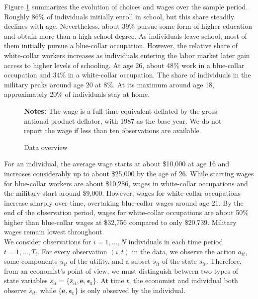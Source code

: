 \noindent Figure \ref{Overview} summarizes the evolution of choices and wages over the sample period. Roughly 86\% of individuals initially enroll in school, but this share steadily declines with age. Nevertheless, about 39\% pursue some form of higher education and obtain more than a high school degree. As individuals leave school, most of them initially pursue a blue-collar occupation. However, the relative share of white-collar workers increases as individuals entering the labor market later gain access to higher levels of schooling. At age 26, about 48\% work in a blue-collar occupation and 34\% in a white-collar occupation. The share of individuals in the military peaks around age 20 at 8\%. At its maximum around age 18, approximately 20\% of individuals stay at home.\\

\begin{figure}[t!]\centering
{}\hspace{0.3cm}
\begin{center}
\begin{minipage}[t]{0.8\columnwidth}
\item \scriptsize{\textbf{Notes:} The wage is a full-time equivalent deflated by the gross national product deflator, with 1987 as the base year. We do not report the wage if less than ten observations are available.}
\end{minipage}
\end{center}
\caption{Data overview}\label{Overview}
\end{figure}\FloatBarrier

\noindent For an individual, the average wage starts at about \$10,000 at age 16 and increases considerably up to about \$25,000 by the age of 26. While starting wages for blue-collar workers are about \$10,286, wages in white-collar occupations and the military start around \$9,000. However, wages for white-collar occupations increase sharply over time, overtaking blue-collar wages around age 21. By the end of the observation period, wages for white-collar occupations are about 50\% higher than blue-collar wages at \$32,756 compared to only \$20,739. Military wages remain lowest throughout.\\

\noindent We consider observations for $i = 1, \hdots, N$ individuals in each time period $t = 1, \dots, T_i$. For every observation $(i, t)$ in the data, we observe the action $a_{it}$, some components $\bar{u}_{it}$ of the utility, and a subset $\bar{s}_{it}$ of the state $s_{it}$. Therefore, from an economist's point of view, we must distinguish between two types of state variables $s_{it} = \{\bar{s}_{it}, \bm{e},\bm{\epsilon_t}\}$. At time $t$, the economist and individual both observe $\bar{s}_{it}$, while $\{ \bm{e},\bm{\epsilon_t}\}$ is only observed by the individual.\\

